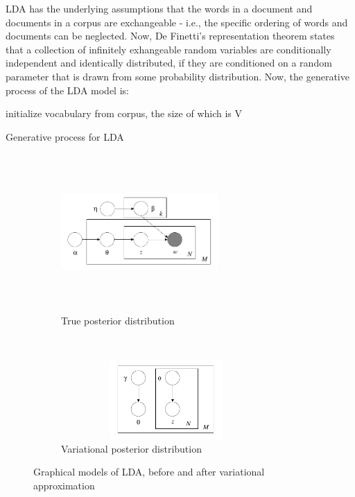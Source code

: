 \documentclass{article} %
\begin{document}
LDA has the underlying assumptions that the words in a document and documents
in a corpus are exchangeable - i.e., the specific ordering of words and
documents can be neglected. Now, De Finetti's representation theorem states that
a collection of infinitely exhangeable random variables are conditionally 
independent and identically distributed, if they are conditioned on a random
parameter that is drawn from some probability distribution. Now, the generative
process of the LDA model is:

\begin{algorithm}
initialize vocabulary from corpus, the size of which is V\;
\caption{Generative process for LDA}
\end{algorithm}

\begin{figure}[h]
	\centering
	\begin{subfigure}[b]{0.45\textwidth}
	\includegraphics[width=6cm,height=6cm,keepaspectratio]{lda-model.png}
	\caption{True posterior distribution}
	\label{fig:lda-model}
	\end{subfigure}
	~
	\begin{subfigure}[b]{0.5\textwidth}
	\includegraphics[width=8cm,height=3cm,keepaspectratio]{lda-variational.png}
	\caption{Variational posterior distribution}
	\label{fig:lda-variational}
	\end{subfigure}
\caption{Graphical models of LDA, before and after variational approximation}
\label{fig:models}
\end{figure}
\end{document}
